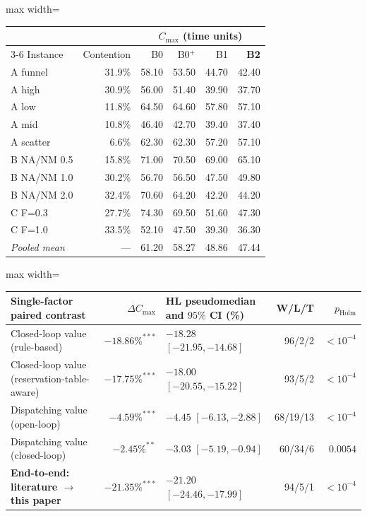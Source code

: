 \begin{adjustbox}{max width=\linewidth}\begin{tabular}{@{}lrrrrr@{}}
\toprule
& & \multicolumn{4}{c}{$C_{\max}$ (time units)} \\
\cmidrule(lr){3-6}
Instance & Contention & B0 & B0$^{+}$ & B1 & \textbf{B2} \\
\midrule
A funnel & 31.9\% & 58.10 & 53.50 & 44.70 & 42.40 \\
A high & 30.9\% & 56.00 & 51.40 & 39.90 & 37.70 \\
A low & 11.8\% & 64.50 & 64.60 & 57.80 & 57.10 \\
A mid & 10.8\% & 46.40 & 42.70 & 39.40 & 37.40 \\
A scatter & 6.6\% & 62.30 & 62.30 & 57.20 & 57.10 \\
\midrule
B NA/NM 0.5 & 15.8\% & 71.00 & 70.50 & 69.00 & 65.10 \\
B NA/NM 1.0 & 30.2\% & 56.70 & 56.50 & 47.50 & 49.80 \\
B NA/NM 2.0 & 32.4\% & 70.60 & 64.20 & 42.20 & 44.20 \\
\midrule
C F=0.3 & 27.7\% & 74.30 & 69.50 & 51.60 & 47.30 \\
C F=1.0 & 33.5\% & 52.10 & 47.50 & 39.30 & 36.30 \\
\midrule
\emph{Pooled mean} & --- & 61.20 & 58.27 & 48.86 & 47.44 \\
\bottomrule
\end{tabular}\end{adjustbox}

\vspace{0.6em}

\begin{adjustbox}{max width=\linewidth}\begin{tabular}{@{}lrlrr@{}}
\toprule
Single-factor paired contrast & $\Delta C_{\max}$ & HL pseudomedian and $95\%$ CI (\%) & W/L/T & $p_{\mathrm{Holm}}$ \\
\midrule
Closed-loop value (rule-based) & $-18.86\%^{***}$ & $-18.28$ $[-21.95,-14.68]$ & 96/2/2 & $<10^{-4}$ \\
Closed-loop value (reservation-table-aware) & $-17.75\%^{***}$ & $-18.00$ $[-20.55,-15.22]$ & 93/5/2 & $<10^{-4}$ \\
Dispatching value (open-loop) & $-4.59\%^{***}$ & $-4.45$ $[-6.13,-2.88]$ & 68/19/13 & $<10^{-4}$ \\
Dispatching value (closed-loop) & $-2.45\%^{**}$ & $-3.03$ $[-5.19,-0.94]$ & 60/34/6 & $0.0054$ \\
\midrule
\textbf{End-to-end: literature $\rightarrow$ this paper} & $-21.35\%^{***}$ & $-21.20$ $[-24.46,-17.99]$ & 94/5/1 & $<10^{-4}$ \\
\bottomrule
\end{tabular}\end{adjustbox}
